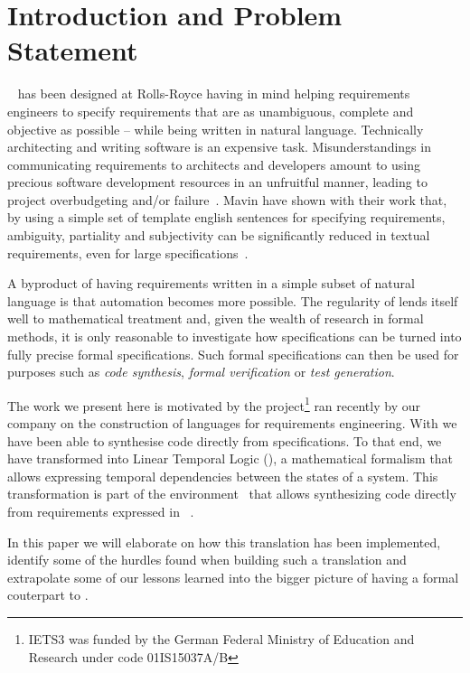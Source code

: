 \section{Introduction and Problem Statement}

\ears~\cite{EARS09} has been designed at Rolls-Royce having in mind helping
requirements engineers to specify requirements that are as unambiguous, complete
and objective as possible -- while being written in natural language.
Technically architecting and writing software is an expensive task.
Misunderstandings in communicating requirements to architects and developers
amount to using precious software development resources in an unfruitful manner,
leading to project overbudgeting and/or failure~\cite{chaos:2014}. Mavin \etal
have shown with their work that, by using a simple set of template english
sentences for specifying requirements, ambiguity, partiality and subjectivity
can be significantly reduced in textual requirements, even for large
specifications~\cite{EARS10,EARS16}.

A byproduct of having requirements written in a simple subset of natural
language is that automation becomes more possible. The regularity of \ears lends
itself well to mathematical treatment and, given the wealth of research in
formal methods, it is only reasonable to investigate how \ears specifications
can be turned into fully precise formal specifications. Such formal
specifications can then be used for purposes such as \emph{code synthesis},
\emph{formal verification} or \emph{test generation}.

The work we present here is motivated by the \iets project\footnote{IETS3 was
funded by the German Federal Ministry of Education and Research under code
01IS15037A/B} ran recently by our company on the construction of languages for
requirements engineering. With \iets we have been able to synthesise code
directly from \ears specifications. To that end, we have transformed \ears into
Linear Temporal Logic (\ltl), a mathematical formalism that allows expressing
temporal dependencies between the states of a system. This transformation is
part of the \earsctrl environment~\cite{earsctrlProcess} that allows
synthesizing code directly from requirements expressed in
\ears~\cite{LucioRCA16,LucioRAM17}.

In this paper we will elaborate on how this translation has been implemented,
identify some of the hurdles found when building such a translation and
extrapolate some of our lessons learned into the bigger picture of having a
formal couterpart to \ears.